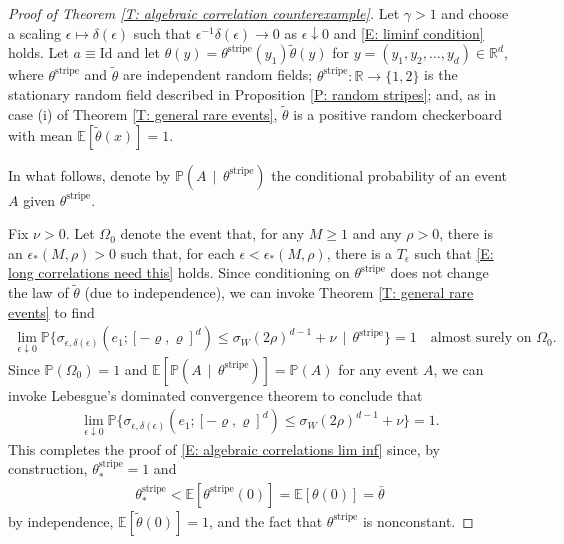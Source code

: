 \documentclass[10pt,a4paper]{amsart}
\begin{document}
\begin{proof}[Proof of Theorem \ref{T: algebraic correlation counterexample}] Let $\gamma > 1$ and choose a scaling $\epsilon \mapsto \delta(\epsilon)$ such that $\epsilon^{-1} \delta(\epsilon) \to 0$ as $\epsilon \downarrow 0$ and \eqref{E: liminf condition} holds.  Let $a \equiv \text{Id}$ and let $\theta(y) = \theta^{\text{stripe}}(y_{1}) \tilde{\theta}(y)$ for $y = (y_{1},y_{2},\dots,y_{d}) \in \mathbb{R}^{d}$, where $\theta^{\text{stripe}}$ and $\tilde{\theta}$ are independent random fields; $\theta^{\text{stripe}} : \mathbb{R} \to \{1,2\}$ is the stationary random field described in Proposition \ref{P: random stripes}; and, as in case (i) of  Theorem \ref{T: general rare events}, $\tilde{\theta}$ is a positive random checkerboard with mean $\mathbb{E} [ \tilde{\theta}(x) ] = 1$.

In what follows, denote by $\mathbb{P}(A \, \mid \, \theta^{\text{stripe}} )$ the conditional probability of an event $A$ given $\theta^{\text{stripe}}$.

Fix $\nu > 0$.  Let $\Omega_{0}$ denote the event that, for any $M \geq 1$ and any $\rho > 0$, there is an $\epsilon_{*}(M,\rho) > 0$ such that, for each $\epsilon < \epsilon_{*}(M,\rho)$, there is a $T_{\epsilon}$ such that \eqref{E: long correlations need this} holds.
Since conditioning on $\theta^{\text{stripe}}$ does not change the law of $\tilde{\theta}$ (due to independence), we can invoke Theorem \ref{T: general rare events} to find
\begin{align*}
\lim_{ \epsilon \downarrow 0 } \mathbb{P} \{ \sigma_{\epsilon,\delta(\epsilon)}(e_{1}; [-\varrho,\varrho]^{d} )  \leq \sigma_{W} ( 2 \rho )^{d-1} + \nu \, \mid \, \theta^{\text{stripe}} \} = 1 \quad \text{almost surely on} \, \, \Omega_{0}.
\end{align*}
Since $\mathbb{P}(\Omega_{0}) = 1$ and $\mathbb{E}[ \mathbb{P}(A \, \mid \, \theta^{\text{stripe}} ) ] = \mathbb{P}(A)$ for any event $A$, we can invoke Lebesgue's dominated convergence theorem to conclude that
\begin{align*}
\lim_{ \epsilon \downarrow 0 } \mathbb{P} \{ \sigma_{\epsilon,\delta(\epsilon)}(e_{1}; [-\varrho,\varrho]^{d} ) \leq \sigma_{W} ( 2 \rho )^{d-1} + \nu \} = 1 .
\end{align*}
This completes the proof of \eqref{E: algebraic correlations lim inf} since, by construction, $\theta^{\text{stripe}}_{*} = 1$ and 
	\begin{align*}
		\theta^{\text{stripe}}_{*} < \mathbb{E} [ \theta^{\text{stripe}}(0) ] = \mathbb{E} [ \theta(0) ] = \bar{\theta}
	\end{align*}
by independence, $\mathbb{E}[\tilde{\theta}(0)] = 1$, and the fact that $\theta^{\text{stripe}}$ is nonconstant.
\end{proof}
\end{document}
